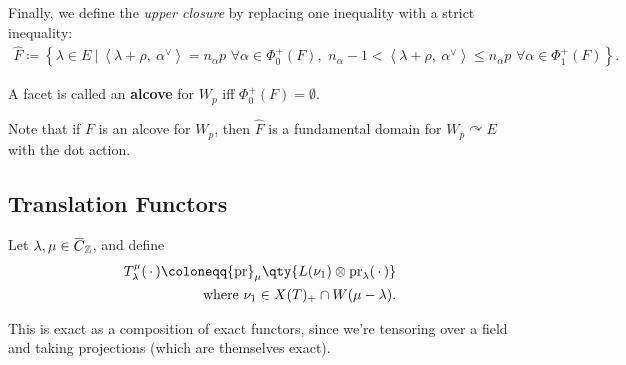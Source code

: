 \begin{definition}

Finally, we define the \emph{upper closure} by replacing one inequality
with a strict inequality:
\begin{align*}  
\widehat{F} \coloneqq\left\{{
\lambda \in E {~\mathrel{\Big|}~}{\left\langle {\lambda + \rho},~{\alpha^\vee} \right\rangle} = n_\alpha p\,\, \forall\alpha\in \Phi_0^+(F),\,\,
n_\alpha - 1 < {\left\langle {\lambda + \rho},~{\alpha^\vee} \right\rangle} \leq n_\alpha p \,\,\forall \alpha\in \Phi_1^+(F)
}\right\}
.\end{align*}

\end{definition}

\begin{definition}[Alcove]

A facet is called an \textbf{alcove} for \(W_p\) iff
\(\Phi_0^+(F) = \emptyset\).

\end{definition}

\begin{remark}

Note that if \(F\) is an alcove for \(W_p\), then \(\widehat{F}\) is a
fundamental domain for \(W_p\curvearrowright E\) with the dot action.

\end{remark}

\hypertarget{translation-functors-1}{%
\subsection{Translation Functors}\label{translation-functors-1}}

Let
\(\lambda, \mu\in \mkern 1.5mu\overline{\mkern-1.5muC\mkern-1.5mu}\mkern 1.5mu_{\mathbb{Z}}\),
and define
\begin{align*}  
T_\lambda^\mu({\,\cdot\,}) \coloneqq
{\operatorname{pr}}_\mu \qty{ L(\nu_1) \otimes{\operatorname{pr}}_\lambda({\,\cdot\,}) }\\
\text{where } 
\nu_1 \in X(T)_+ \cap W(\mu-\lambda)
.\end{align*}

This is exact as a composition of exact functors, since we're tensoring
over a field and taking projections (which are themselves exact).

